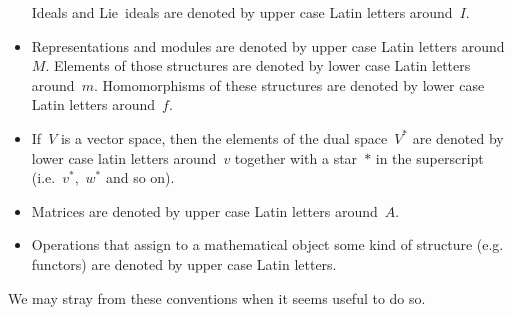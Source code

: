 \begin{itemize}
		Ideals and Lie~ideals are denoted by upper case Latin letters around~$I$.
	\item
		Representations and modules are denoted by upper case Latin letters around~$M$.
		Elements of those structures are denoted by lower case Latin letters around~$m$.
		Homomorphisms of these structures are denoted by lower case Latin letters around~$f$.
	\item
		If~$V$ is a vector space, then the elements of the dual space~$V^*$ are denoted by lower case latin letters around~$v$ together with a star~$*$ in the superscript (i.e.~$v^*$,~$w^*$ and so on).
	\item
		Matrices are denoted by upper case Latin letters around~$A$.
	\item
		Operations that assign to a mathematical object some kind of structure (e.g. functors) are denoted by upper case Latin letters.
\end{itemize}

We may stray from these conventions when it seems useful to do so.
